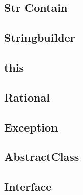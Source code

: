     \subsection{Str Contain}
        
    \subsection{Stringbuilder}
         

    \subsection{this}
        

    \subsection{Rational}
        
    \subsection{Exception}
        

    \subsection{AbstractClass}
            
    \subsection{Interface}
            